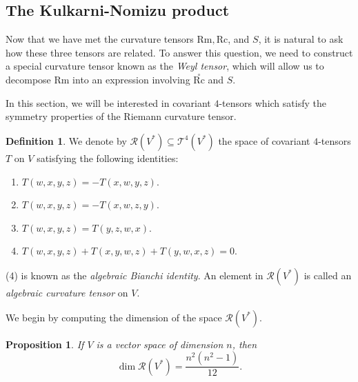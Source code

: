 \documentclass{amsart}
\numberwithin{equation}{section}
\def\~#1{\mathscr{#1}}
\newcommand{\Rc}{\mathrm{Rc}}
\newcommand{\Rm}{\mathrm{Rm}}
\newcommand{\tRc}{\overset{\circ}{\Rc}}
\theoremstyle{plain}
\newtheorem{prop}[thm]{Proposition}
\theoremstyle{definition}
\newtheorem{defn}[thm]{Definition}
\theoremstyle{remark}
\begin{document}
\subsection{The Kulkarni-Nomizu product}
Now that we have met the curvature tensors $\Rm,\Rc$, and $S$, it is natural to ask how these three tensors are related. To answer this question, we need to construct a special curvature tensor known as the \emph{Weyl tensor}, which will allow us to decompose $\Rm$ into an expression involving $\tRc$ and $S$. 

In this section, we will be interested in covariant $4$-tensors which satisfy the symmetry properties of the Riemann curvature tensor. 
\begin{defn}\label{def:R(V^*)}
    We denote by $\~R(V^*) \subseteq \~T^4(V^*)$ the space of covariant $4$-tensors $T$ on $V$ satisfying the following identities:
    \begin{enumerate}
        \item $T(w,x,y,z) = -T(x, w, y, z)$.
        \item $T(w,x,y,z) = -T(x, w, z, y)$.
        \item $T(w,x,y,z) = T(y,z,w,x)$.
        \item $T(w,x,y,z) + T(x,y,w,z) + T(y,w,x,z) = 0$.
    \end{enumerate}
    (4) is known as the \emph{algebraic Bianchi identity}. An element in $\~R(V^*)$ is called an \emph{algebraic curvature tensor} on $V$.
\end{defn}
We begin by computing the dimension of the space $\~R(V^*)$.
\begin{prop}\label{prop:dimR(V^*)}
    If $V$ is a vector space of dimension $n$, then 
    \begin{equation}\label{eq:dimR(V^*)}
    \dim\~R(V^*) = \frac{n^2(n^2-1)}{12}.
    \end{equation}
\end{prop}
\end{document}
